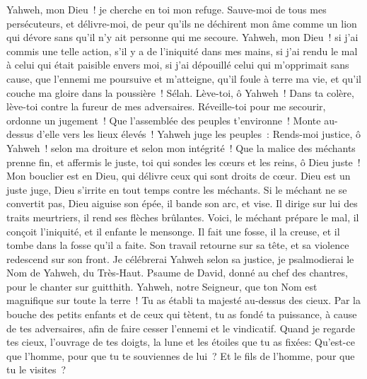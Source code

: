 \begin{multicols}{2}
Yahweh, mon Dieu~! je cherche en toi mon refuge. Sauve-moi de tous mes persécuteurs, et délivre-moi,
de peur qu'ils ne déchirent mon âme comme un lion qui dévore sans qu'il n'y ait personne qui me secoure.
Yahweh, mon Dieu~! si j'ai commis une telle action, s'il y a de l'iniquité dans mes mains,
si j'ai rendu le mal à celui qui était paisible envers moi, si j'ai dépouillé celui qui m'opprimait sans cause,
que l'ennemi me poursuive et m'atteigne, qu'il foule à terre ma vie, et qu'il couche ma gloire dans la poussière~! Sélah.
Lève-toi, ô Yahweh~! Dans ta colère, lève-toi contre la fureur de mes adversaires. Réveille-toi pour me secourir, ordonne un jugement~!
Que l'assemblée des peuples t'environne~! Monte au-dessus d'elle vers les lieux élevés~!
Yahweh juge les peuples~: Rends-moi justice, ô Yahweh~! selon ma droiture et selon mon intégrité~!
Que la malice des méchants prenne fin, et affermis le juste, toi qui sondes les cœurs et les reins, ô Dieu juste~!
Mon bouclier est en Dieu, qui délivre ceux qui sont droits de cœur.
Dieu est un juste juge, Dieu s'irrite en tout temps contre les méchants.
Si le méchant ne se convertit pas, Dieu aiguise son épée, il bande son arc, et vise.
Il dirige sur lui des traits meurtriers, il rend ses flèches brûlantes.
Voici, le méchant prépare le mal, il conçoit l'iniquité, et il enfante le mensonge.
Il fait une fosse, il la creuse, et il tombe dans la fosse qu'il a faite.
Son travail retourne sur sa tête, et sa violence redescend sur son front.
Je célébrerai Yahweh selon sa justice, je psalmodierai le Nom de Yahweh, du Très-Haut.
\VerseOne{}Psaume de David, donné au chef des chantres, pour le chanter sur guitthith.
Yahweh, notre Seigneur, que ton Nom est magnifique sur toute la terre~! Tu as établi ta majesté au-dessus des cieux.
Par la bouche des petits enfants et de ceux qui tètent, tu as fondé ta puissance, à cause de tes adversaires, afin de faire cesser l'ennemi et le vindicatif.
Quand je regarde tes cieux, l'ouvrage de tes doigts, la lune et les étoiles que tu as fixées:
Qu'est-ce que l'homme, pour que tu te souviennes de lui~? Et le fils de l'homme, pour que tu le visites~?

\end{multicols}
